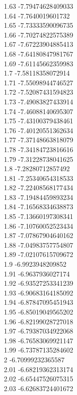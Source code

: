 {1.63	-7.79474628409033\\
1.64	-7.7640019601732\\
1.65	-7.73333590096735\\
1.66	-7.70274822575389\\
1.67	-7.67223904885413\\
1.68	-7.64180847981767\\
1.69	-7.61145662359983\\
1.7	-7.58118358072914\\
1.71	-7.55098944746527\\
1.72	-7.52087431594823\\
1.73	-7.49083827433914\\
1.74	-7.46088140695307\\
1.75	-7.43100379438461\\
1.76	-7.40120551362634\\
1.77	-7.37148663818079\\
1.78	-7.34184723816616\\
1.79	-7.31228738041625\\
1.8	-7.28280712857492\\
1.81	-7.25340654318533\\
1.82	-7.22408568177434\\
1.83	-7.19484459893234\\
1.84	-7.16568334638873\\
1.85	-7.13660197308341\\
1.86	-7.10760052523434\\
1.87	-7.07867904640162\\
1.88	-7.04983757754807\\
1.89	-7.02107615709672\\
1.9	-6.9923948209852\\
1.91	-6.9637936027174\\
1.92	-6.93527253341239\\
1.93	-6.90683164185092\\
1.94	-6.87847095451943\\
1.95	-6.85019049565202\\
1.96	-6.82199028727018\\
1.97	-6.79387034922068\\
1.98	-6.76583069921147\\
1.99	-6.73787135284602\\
2	-6.70999232365587\\
2.01	-6.68219362313174\\
2.02	-6.65447526075315\\
2.03	-6.62683724401672\\
}

